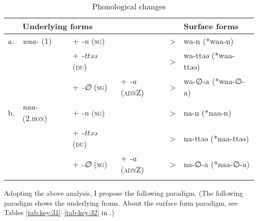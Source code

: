 \begin{table}
\caption{\label{tab:key:35}Phonological changes}
\begin{tabular}{ *{6}{l} }
\lsptoprule
   & \multicolumn{3}{l}{Underlying forms} & & \multicolumn{1}{l}{Surface forms}\\\midrule
a. & \textit{waa-} (1)     & +  \textit{{}-n}    (\textsc{sg}) &                        & > & wa-n    (*waa-n)   \\
   &                       & +  \textit{{}-ttəə} (\textsc{du}) &                        & > & wa-ttəə (*waa-ttəə)\\
   &                       & +  \textit{{}-∅}    (\textsc{sg}) & + \textit{{}-a} (\textsc{adn}Z) & > & wa-∅-a  (*waa-∅-a) \\
b. & \textit{naa-} (2.\textsc{hon}) & +  \textit{{}-n}    (\textsc{sg}) &                        & > & na-n    (*naa-n)   \\
   &                       & +  \textit{{}-ttəə} (\textsc{du}) &                        & > & na-ttəə (*naa-ttəə)\\
   &                       & +  \textit{{}-∅}    (\textsc{sg}) & + \textit{{}-a} (\textsc{adn}Z) & > & na-∅-a  (*naa-∅-a) \\
\lspbottomrule
\end{tabular}
\end{table}

Adopting the above analysis, I propose the following paradigm. (The following paradigm shows the underlying froms. About the surface form paradigm, see Tables \ref{tab:key:31}--\ref{tab:key:32} in .)

